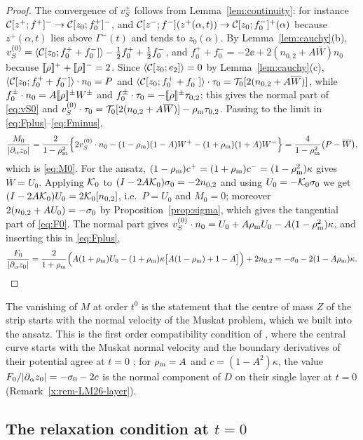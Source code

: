 \begin{proof}
The convergence of $v_S^\pm$ follows from Lemma~\ref{lem:continuity}: for instance $\mathcal{C}[z^+;f^+]^-\to\mathcal{C}[z_0;f_0^+]^-$, and $\mathcal{C}[z^-;f^-](z^+(\alpha,t))\to\mathcal{C}[z_0;f_0^-]^+(\alpha)$ because $z^+(\alpha,t)$ lies above
$\Gamma^-(t)$ and tends to $z_0(\alpha)$. By Lemma~\ref{lem:cauchy}(b),
$v_S^{(0)}=\langle \mathcal{C}[z_0;f_0^++f_0^-]\rangle-\frac12f_0^++\frac12f_0^-$, and $f_0^++f_0^-=-2\ee+2(n_{0,2}+A\overline W)n_0$ because $[\![\rho]\!]^++[\![\rho]\!]^-=2$. Since $\langle \mathcal{C}[z_0;e_2]\rangle=0$ by
Lemma~\ref{lem:cauchy}(c), $\langle \mathcal{C}[z_0;f_0^++f_0^-]\rangle\cdot n_0=P$ and $\langle \mathcal{C}[z_0;f_0^++f_0^-]\rangle\cdot\tau_0=\mathcal{T}_0[2(n_{0,2}+A\overline W)]$, while
$f_0^\pm\cdot n_0=A[\![\rho]\!]^\pm W^\pm$ and $f_0^\pm\cdot\tau_0=-[\![\rho]\!]^\pm\tau_{0,2}$; this gives the normal part of \eqref{eq:vS0} and
$v_S^{(0)}\cdot\tau_0=\mathcal{T}_0[2(n_{0,2}+A\overline W)]-\rho_{\mathrm m}\tau_{0,2}$. Passing to the limit in \eqref{eq:Fplus}--\eqref{eq:Fminus},
\[
\frac{M_0}{|\partial_\alpha z_0|}=\frac{2}{1-\rho_{\mathrm m}^2}\Big\{2v_S^{(0)}\cdot n_0-(1-\rho_{\mathrm m})(1-A)W^+-(1+\rho_{\mathrm m})(1+A)W^-\Big\}=\frac{4}{1-\rho_{\mathrm m}^2}\big(P-\overline W\big),
\]
which is \eqref{eq:M0}. For the ansatz, $(1-\rho_{\mathrm m})c^+=(1+\rho_{\mathrm m})c^-=(1-\rho_{\mathrm m}^2)\kappa$ gives $\overline W=U_0$. Applying $\mathcal{K}_0$ to $(I-2A\mathcal{K}_0)\sigma_0=-2n_{0,2}$ and using $U_0=-\mathcal{K}_0\sigma_0$ we get
$(I-2A\mathcal{K}_0)U_0=2\mathcal{K}_0[n_{0,2}]$, i.e.\ $P=U_0$ and $M_0=0$; moreover $2(n_{0,2}+AU_0)=-\sigma_0$ by Proposition~\ref{prop:sigma}, which gives the tangential part of \eqref{eq:F0}. The normal part gives
$v_S^{(0)}\cdot n_0=U_0+A\rho_{\mathrm m} U_0-A(1-\rho_{\mathrm m}^2)\kappa$, and inserting this in \eqref{eq:Fplus},
\[
\frac{F_0}{|\partial_\alpha z_0|}=\frac{2}{1+\rho_{\mathrm m}}\Big(A(1+\rho_{\mathrm m})U_0-(1+\rho_{\mathrm m})\kappa\big[A(1-\rho_{\mathrm m})+1-A\big]\Big)+2n_{0,2}=-\sigma_0-2(1-A\rho_{\mathrm m})\kappa .\qedhere
\]
\end{proof}

The vanishing of $M$ at order $t^0$ is the statement that the centre of mass $Z$ of the strip starts with the normal velocity of the Muskat problem, which we built into the ansatz. This is the
first order compatibility condition of \cite[Lemma~5.2]{LM26}, where the central curve starts with the Muskat normal velocity and the boundary derivatives of their potential agree at $t=0$
\cite[(5.14)]{LM26}; for $\rho_{\mathrm m}=A$ and $c=(1-A^2)\kappa$, the value $F_0/|\partial_\alpha z_0|=-\sigma_0-2c$ is the normal component of $D$ on their single layer at $t=0$
(Remark~\ref{x:rem-LM26-layer}).

\subsection{The relaxation condition at $t=0$}

